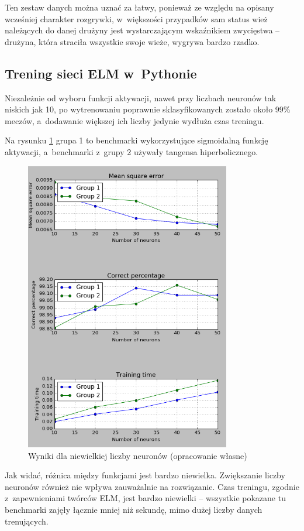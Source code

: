 \documentclass[pl]{minipw} %
\begin{document}
Ten zestaw danych można uznać za łatwy, ponieważ ze względu na opisany wcześniej charakter rozgrywki, w~większości przypadków sam status wież należących do danej drużyny jest wystarczającym wskaźnikiem zwycięstwa -- drużyna, która straciła wszystkie swoje wieże, wygrywa bardzo rzadko.
\subsection{Trening sieci ELM w~Pythonie}
Niezależnie od wyboru funkcji aktywacji, nawet przy liczbach neuronów tak niskich jak 10, po wytrenowaniu poprawnie sklasyfikowanych zostało około 99\% meczów, a~dodawanie większej ich liczby jedynie wydłuża czas treningu. 

Na rysunku \ref{wyniki_dota2_python} grupa 1 to benchmarki wykorzystujące sigmoidalną funkcję aktywacji, a~benchmarki z~grupy 2 używały tangensa hiperbolicznego.

\begin{figure}[H]
\centering
\includegraphics[width=0.8\textwidth]{wyniki_dota2_python.png}
\caption[Wyniki dla niewielkiej liczby neuronów]{Wyniki dla niewielkiej liczby neuronów (opracowanie własne)}
\label{wyniki_dota2_python}
\end{figure}
Jak widać, różnica między funkcjami jest bardzo niewielka. Zwiększanie liczby neuronów również nie wpływa zauważalnie na rozwiązanie. Czas treningu, zgodnie z~zapewnieniami twórców ELM, jest bardzo niewielki -- wszystkie pokazane tu benchmarki zajęły łącznie mniej niż sekundę, mimo dużej liczby danych trenujących. 
\end{document}
